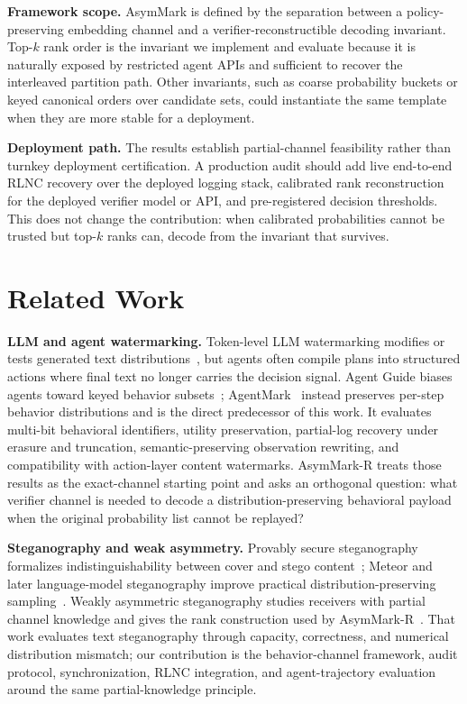 \documentclass[conference,compsoc]{IEEEtran}
\newcommand{\framework}{AsymMark}
\newcommand{\ours}{AsymMark-R}
\begin{document}
\textbf{Framework scope.}
\framework{} is defined by the separation between a policy-preserving embedding channel and a verifier-reconstructible decoding invariant. Top-$k$ rank order is the invariant we implement and evaluate because it is naturally exposed by restricted agent APIs and sufficient to recover the interleaved partition path. Other invariants, such as coarse probability buckets or keyed canonical orders over candidate sets, could instantiate the same template when they are more stable for a deployment.

\textbf{Deployment path.}
The results establish partial-channel feasibility rather than turnkey deployment certification. A production audit should add live end-to-end RLNC recovery over the deployed logging stack, calibrated rank reconstruction for the deployed verifier model or API, and pre-registered decision thresholds. This does not change the contribution: when calibrated probabilities cannot be trusted but top-$k$ ranks can, decode from the invariant that survives.

\section{Related Work}
\label{sec:related-work}

\textbf{LLM and agent watermarking.}
Token-level LLM watermarking modifies or tests generated text distributions~\cite{kirchenbauer2023watermark,dathathri2024synthid,kirchenbauer2024reliability,kuditipudi2024robust}, but agents often compile plans into structured actions where final text no longer carries the decision signal. Agent Guide biases agents toward keyed behavior subsets~\cite{agentguide2025}; AgentMark~\cite{agentmark2026} instead preserves per-step behavior distributions and is the direct predecessor of this work. It evaluates multi-bit behavioral identifiers, utility preservation, partial-log recovery under erasure and truncation, semantic-preserving observation rewriting, and compatibility with action-layer content watermarks. \ours{} treats those results as the exact-channel starting point and asks an orthogonal question: what verifier channel is needed to decode a distribution-preserving behavioral payload when the original probability list cannot be replayed?

\textbf{Steganography and weak asymmetry.}
Provably secure steganography formalizes indistinguishability between cover and stego content~\cite{hopper2002provably}; Meteor and later language-model steganography improve practical distribution-preserving sampling~\cite{kaptchuk2021meteor,christ2024undetectable,zamir2024steganography,sparsamp2025}. Weakly asymmetric steganography studies receivers with partial channel knowledge and gives the rank construction used by \ours{}~\cite{weakasym2026}. That work evaluates text steganography through capacity, correctness, and numerical distribution mismatch; our contribution is the behavior-channel framework, audit protocol, synchronization, RLNC integration, and agent-trajectory evaluation around the same partial-knowledge principle.
\end{document}

